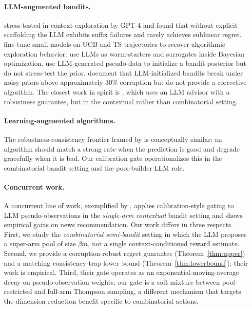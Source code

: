 \documentclass{article}
\theoremstyle{plain}
\theoremstyle{definition}
\theoremstyle{remark}
\begin{document}
\paragraph{LLM-augmented bandits.} \citet{krishnamurthy2024canllms} stress-tested in-context exploration by GPT-4 and found that without explicit scaffolding the LLM exhibits suffix failures and rarely achieves sublinear regret. \citet{nie2024evolve} fine-tune small models on UCB and TS trajectories to recover algorithmic exploration behavior. \citet{liu2024llambo} use LLMs as warm-starters and surrogates inside Bayesian optimization. \citet{alamdari2024jumpstarting} use LLM-generated pseudo-data to initialize a bandit posterior but do not stress-test the prior. \citet{bayley2025jumpstart} document that LLM-initialized bandits break under noisy priors above approximately $30\%$ corruption but do not provide a corrective algorithm. The closest work in spirit is \citet{cao2026libra}, which uses an LLM advisor with a robustness guarantee, but in the contextual rather than combinatorial setting.

\paragraph{Learning-augmented algorithms.} The robustness-consistency frontier framed by \citet{lykouris2018competitive} is conceptually similar: an algorithm should match a strong rate when the prediction is good and degrade gracefully when it is bad. Our calibration gate operationalizes this in the combinatorial bandit setting and the pool-builder LLM role.

\paragraph{Concurrent work.} A concurrent line of work, exemplified by \citet{calibgated2025}, applies calibration-style gating to LLM pseudo-observations in the \emph{single-arm contextual} bandit setting and shows empirical gains on news recommendation. Our work differs in three respects. First, we study the \emph{combinatorial semi-bandit} setting in which the LLM proposes a super-arm pool of size $\beta m$, not a single context-conditioned reward estimate. Second, we provide a corruption-robust regret guarantee (Theorem~\ref{thm:upper}) and a matching consistency-trap lower bound (Theorem~\ref{thm:lowerbound}); their work is empirical. Third, their gate operates as an exponential-moving-average decay on pseudo-observation weights; our gate is a soft mixture between pool-restricted and full-arm Thompson sampling, a different mechanism that targets the dimension-reduction benefit specific to combinatorial actions.
\end{document}
